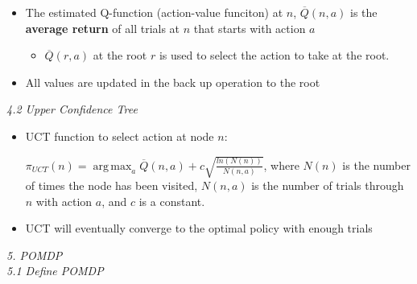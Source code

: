 \documentclass[12pt]{article}
\begin{document}
\begin{itemize}
\begin{itemize}
 \item The estimated Q-function (action-value funciton) at $n$,  $\overline Q(n,a)$ is the \textbf{average return} of all trials at $n$ that starts with action $a$
  \begin{itemize}
 \item $\overline Q(r,a)$ at the root $r$ is used to select the action to take at the root.
 \end{itemize}
 
 \item All values are updated in the back up operation to the root
\end{itemize}

\end{itemize}


\noindent
\textsl{4.2 Upper Confidence Tree}

\begin{itemize}
\item UCT function to select action at node $n$:

$\pi_{UCT}(n) =  \operatorname*{arg\,max}_{a}{\overline Q (n, a) + c\sqrt{\frac{ln(N(n))}{N(n, a)}}}$, where $N(n)$ is the number of times the node has been visited, $N(n, a)$ is the number of trials through $n$ with action $a$, and $c$ is a constant.

\item UCT will eventually converge to the optimal policy with enough trials
\end{itemize}

\noindent
\textsl{5. POMDP}\\

\noindent
\textsl{5.1 Define POMDP}
\end{document}
